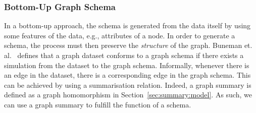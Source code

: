 \subsubsection{Bottom-Up Graph Schema}

In a bottom-up approach, the schema is generated from the data itself by using some features of the data, e.g., attributes of a node. In order to generate a schema, the process must then preserve the \emph{structure} of the graph. %
Buneman et. al.~\cite{buneman:1997:asu} defines that a graph dataset conforms to a graph schema if there exists a simulation from the dataset to the graph schema. Informally, whenever there is an edge in the dataset, there is a corresponding edge in the graph schema. 
This can be achieved by using a summarisation relation. Indeed, a graph summary is defined as a graph homomorphism in Section~\ref{sec:summary:model}. As such, we can use a graph summary to fulfill the function of a schema.



